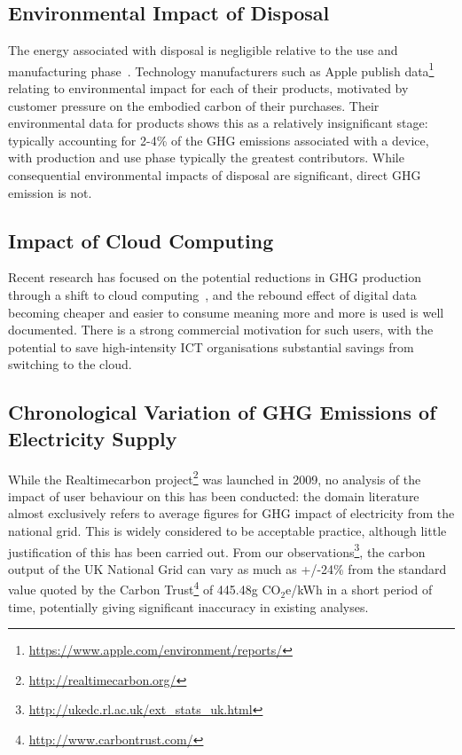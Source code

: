 \documentclass[conference]{IEEEtran}
\begin{document}
\subsection{Environmental Impact of Disposal}

The energy associated with disposal is negligible relative to the use
and manufacturing phase~\cite{williams:2004}. Technology manufacturers
such as Apple publish
data\footnote{\url{https://www.apple.com/environment/reports/}}
relating to environmental impact for each of their products, motivated
by customer pressure on the embodied carbon of their purchases. Their
environmental data for products shows this as a relatively
insignificant stage: typically accounting for 2-4\% of the GHG
emissions associated with a device, with production and use phase
typically the greatest contributors. While consequential environmental
impacts of disposal are significant, direct GHG emission is not.

\subsection{Impact of Cloud Computing}

Recent research has focused on the potential reductions in GHG
production through a shift to cloud
computing~\cite{williams-et-al:2014}, and the rebound effect of
digital data becoming cheaper and easier to consume meaning more and
more is used is well documented. There is a strong commercial
motivation for such users, with the potential to save high-intensity
ICT organisations substantial savings from switching to the cloud.


\subsection{Chronological Variation of GHG Emissions of Electricity
  Supply}

While the Realtimecarbon
project\footnote{\url{http://realtimecarbon.org/}} was launched in
2009, no analysis of the impact of user behaviour on this has been
conducted: the domain literature almost exclusively refers to average
figures for GHG impact of electricity from the national grid. This is
widely considered to be acceptable practice, although little
justification of this has been carried out. From our
observations\footnote{\url{http://ukedc.rl.ac.uk/ext_stats_uk.html}},
the carbon output of the UK National Grid can vary as much as +/-24\%
from the standard value quoted by the Carbon
Trust\footnote{\url{http://www.carbontrust.com/}} of 445.48g
CO$_2$e/kWh in a short period of time, potentially giving significant
inaccuracy in existing analyses.
\end{document}
